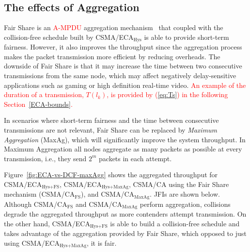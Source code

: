 	\subsection{The effects of Aggregation}\label{effects-of-aggregation}
	Fair Share is an \textcolor{red}{A-MPDU} aggregation mechanism~\cite{A-MPDU} that coupled with the collision-free schedule built by CSMA/ECA$_{\text{Hys}}$ is able to provide short-term fairness. However, it also improves the throughput since the aggregation process makes the packet transmission more efficient by reducing overheads. The downside of Fair Share is that it may increase the time between two consecutive transmissions from the same node, which may affect negatively delay-sensitive applications such as gaming or high definition real-time video. \textcolor{red}{An example of the duration of a transmission, $T(l_{k})$, is provided by (\ref{eq:Ts}) in the following Section~\ref{ECA-bounds}.}
	
	In scenarios where short-term fairness and the time between consecutive transmissions are not relevant, Fair Share can be replaced by \emph{Maximum Aggregation} (MaxAg), which will significantly improve the system throughput. In Maximum Aggregation all nodes aggregate as many packets as possible at every transmission, i.e., they send $2^m$ packets in each attempt.

	Figure~\ref{fig:ECA-vs-DCF-maxAgg} shows the aggregated throughput for CSMA/ECA$_{\text{Hys+FS}}$, CSMA/ECA$_{\text{Hys+MaxAg}}$, CSMA/CA using the Fair Share mechanism (CSMA/CA$_{\text{FS}}$), and CSMA/CA$_{\text{MaxAg}}$. JFIs are shown below. Although CSMA/CA$_{\text{FS}}$ and CSMA/CA$_{\text{MaxAg}}$ perform aggregation, collisions degrade the aggregated throughput as more contenders attempt transmission. On the other hand, CSMA/ECA$_{\text{Hys+FS}}$ is able to build a collision-free schedule and takes advantage of the aggregation provided by Fair Share, which opposed to just using CSMA/ECA$_{\text{Hys+MaxAg}}$, it is fair.
	
